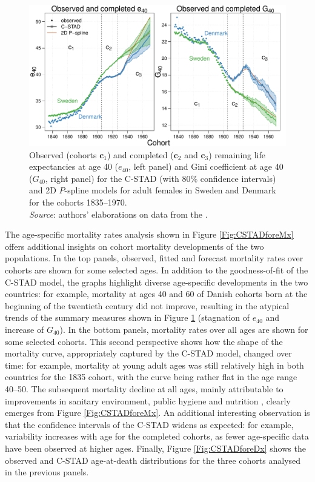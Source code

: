 \documentclass[11pt, a4paper]{article}
\begin{document}
\begin{figure}[t]
	\begin{center}
		\includegraphics[scale=0.57]{./Figures/F6.pdf} 
		\caption{Observed (cohorts $\bm{c}_1$) and completed ($\bm{c}_2$ and $\bm{c}_3$) remaining life expectancies at age 40 ($e_{40}$, left panel) and Gini coefficient at age 40 ($G_{40}$, right panel) for the C-STAD (with 80\% confidence intervals) and 2D $P$-spline models for adult females in Sweden and Denmark for the cohorts 1835--1970.\\ \small \textit{Source}: authors' elaborations on data from the \cite{HMD}.\label{Fig:CSTADforeE40G40}}    
	\end{center}
\end{figure}

The age-specific mortality rates analysis shown in Figure \ref{Fig:CSTADforeMx} offers additional insights on cohort mortality developments of the two populations. In the top panels, observed, fitted and forecast mortality rates over cohorts are shown for some selected ages. In addition to the goodness-of-fit of the C-STAD model, the graphs highlight diverse age-specific developments in the two countries: for example, mortality at ages 40 and 60 of Danish cohorts born at the beginning of the twentieth century did not improve, resulting in the atypical trends of the summary measures shown in Figure \ref{Fig:CSTADforeE40G40} (stagnation of $e_{40}$ and increase of $G_{40}$). In the bottom panels, mortality rates over all ages are shown for some selected cohorts. This second perspective shows how the shape of the mortality curve, appropriately captured by the C-STAD model, changed over time: for example, mortality at young adult ages was still relatively high in both countries for the 1835 cohort, with the curve being rather flat in the age range 40--50. The subsequent mortality decline at all ages, mainly attributable to improvements in sanitary environment, public hygiene and nutrition \citep{mckeown1976modern}, clearly emerges from Figure \ref{Fig:CSTADforeMx}. An additional interesting observation is that the confidence intervals of the C-STAD widens as expected: for example, variability increases with age for the completed cohorts, as fewer age-specific data have been observed at higher ages. Finally, Figure \ref{Fig:CSTADforeDx} shows the observed and C-STAD age-at-death distributions for the three cohorts analysed in the previous panels. 
\end{document}
